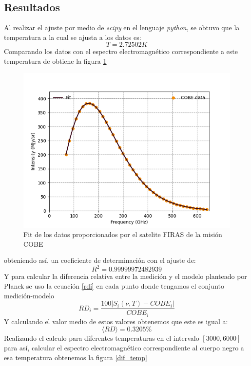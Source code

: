 \documentclass[12pt,letterpaper]{article}
\begin{document}
\begin{multicols}{2}
\section*{Resultados}
Al realizar el ajuste por medio de \textit{scipy} en el lenguaje  \textit{python}, se obtuvo que la temperatura a la cual se ajusta a los datos es:
\begin{equation*}
T=2.72502K
\end{equation*}
Comparando los datos con el espectro electromagnético correspondiente a este temperatura de obtiene la figura \ref{fit}
\begin{figure}[H]
\includegraphics[scale=0.45]{../Graphics/fit.png}
\caption{Fit de los datos proporcionados por el satelite FIRAS de la misión COBE}
\label{fit}
\end{figure}
obteniendo así, un coeficiente de determinación con el ajuste de:
\begin{equation*}
R^2=0.99999972482939
\label{coef_deter}
\end{equation*}
Y para calcular la diferencia relativa entre la medición y el modelo planteado por Planck se uso la ecuación \ref{rdi} en cada punto donde tengamos el conjunto medición-modelo
\begin{equation}
RD_i = \frac{100|S_i(\nu,T)-COBE_i|}{COBE_i}
\label{rdi}
\end{equation}
Y calculando el valor medio de estos valores obtenemos que este es igual a:
\begin{equation*}
\langle RD \rangle = 0.3205\%
\end{equation*}
Realizando el calculo para diferentes temperaturas en el intervalo $[3000,6000]$ para así, calcular el espectro electromagnético correspondiente al cuerpo negro a esa temperatura obtenemos la figura \ref{dif_temp}

\end{multicols}
\end{document}
